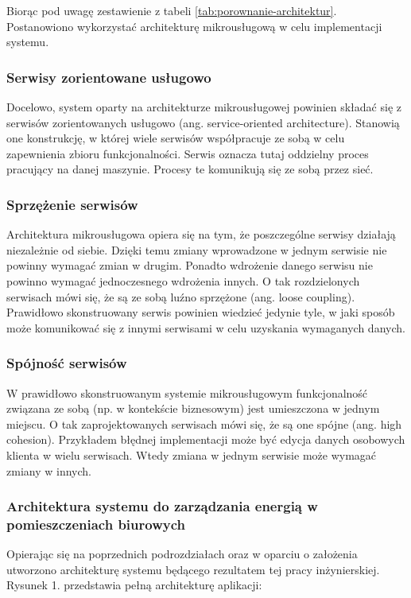 \documentclass[11pt, a4]{article} %
\begin{document}
Biorąc pod uwagę zestawienie z tabeli \ref{tab:porownanie-architektur}. Postanowiono wykorzystać architekturę 
mikrousługową w celu implementacji systemu.

\subsubsection{Serwisy zorientowane usługowo}

Docelowo, system oparty na architekturze mikrousługowej powinien składać się z serwisów 
zorientowanych usługowo (ang. service-oriented architecture). Stanowią one 
konstrukcję, w której wiele serwisów współpracuje ze sobą w celu zapewnienia zbioru 
funkcjonalności. Serwis oznacza tutaj oddzielny proces pracujący na danej maszynie. 
Procesy te komunikują się ze sobą przez sieć.

\subsubsection{Sprzężenie serwisów}

Architektura mikrousługowa opiera się na tym, że poszczególne serwisy działają 
niezależnie od siebie. Dzięki temu zmiany wprowadzone w jednym serwisie nie powinny 
wymagać zmian w drugim. Ponadto wdrożenie danego serwisu nie powinno wymagać 
jednoczesnego wdrożenia innych. O tak rozdzielonych serwisach mówi się, że są ze sobą 
luźno sprzężone (ang. loose coupling). Prawidłowo skonstruowany serwis powinien 
wiedzieć jedynie tyle, w jaki sposób może komunikować się z innymi serwisami w celu 
uzyskania wymaganych danych.

\subsubsection{Spójność serwisów}
W prawidłowo skonstruowanym systemie mikrousługowym funkcjonalność związana ze 
sobą (np. w kontekście biznesowym) jest umieszczona w jednym miejscu. O tak 
zaprojektowanych serwisach mówi się, że są one spójne (ang. high cohesion). Przykładem 
błędnej implementacji może być edycja danych osobowych klienta w wielu serwisach. 
Wtedy zmiana w jednym serwisie może wymagać zmiany w innych.

\subsubsection{Architektura systemu do zarządzania energią w pomieszczeniach biurowych}

Opierając się na poprzednich podrozdziałach oraz w oparciu o założenia utworzono 
architekturę systemu będącego rezultatem tej pracy inżynierskiej. Rysunek 1. 
przedstawia pełną architekturę aplikacji:
\end{document}
